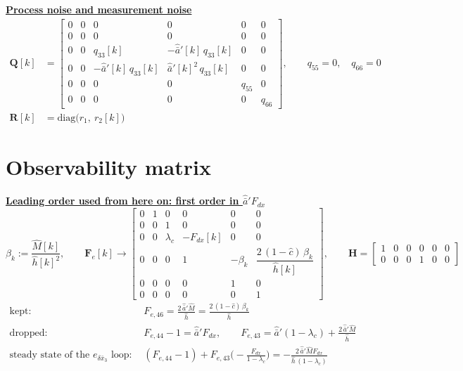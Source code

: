 \documentclass[11pt,a4paper]{ctexart}
\newcommand{\lc}{\lambda_c}
\newcommand{\bx}{\bar{x}}
\newcommand{\ba}{\bar{a}}
\newcommand{\hh}{\hat{h}}
\newcommand{\ch}{\hat{c}}
\newcommand{\hd}[1]{\par\bigskip\noindent\underline{\textbf{#1}}}
\begin{document}
\hd{Process noise and measurement noise}
\[
\begin{aligned}
\mathbf{Q}[k] &=
\begin{bmatrix}
0 & 0 & 0 & 0 & 0 & 0 \\
0 & 0 & 0 & 0 & 0 & 0 \\
0 & 0 & q_{33}[k] & -\hat{\ba}'[k]\,q_{33}[k] & 0 & 0 \\
0 & 0 & -\hat{\ba}'[k]\,q_{33}[k] & \hat{\ba}'[k]^{2}\,q_{33}[k] & 0 & 0 \\
0 & 0 & 0 & 0 & q_{55} & 0 \\
0 & 0 & 0 & 0 & 0 & q_{66}
\end{bmatrix},
\qquad q_{55} = 0, \quad q_{66} = 0 \\
\mathbf{R}[k] &= \mathrm{diag}\big(r_1,\ r_2[k]\big)
\end{aligned}
\]

\clearpage
\section{Observability matrix}

\hd{Leading order used from here on: first order in $\hat{\ba}'F_{dx}$}
\[
\beta_k := \frac{\hat{M}[k]}{\hh[k]^{2}}, \qquad
\mathbf{F}_e[k] \to
\begin{bmatrix}
0 & 1 & 0 & 0 & 0 & 0 \\
0 & 0 & 1 & 0 & 0 & 0 \\
0 & 0 & \lc & -F_{dx}[k] & 0 & 0 \\
0 & 0 & 0 & 1 & -\beta_k & \dfrac{2\,(1-\ch)\,\beta_k}{\hh[k]} \\
0 & 0 & 0 & 0 & 1 & 0 \\
0 & 0 & 0 & 0 & 0 & 1
\end{bmatrix}, \qquad
\mathbf{H} =
\begin{bmatrix}
1 & 0 & 0 & 0 & 0 & 0 \\
0 & 0 & 0 & 1 & 0 & 0
\end{bmatrix}
\]
\[
\begin{aligned}
\text{kept:}\quad & F_{e,46} = \frac{2\,\hat{\ba}'\hat{M}}{\hh} = \frac{2\,(1-\ch)\,\beta_k}{\hh} \\
\text{dropped:}\quad & F_{e,44} - 1 = \hat{\ba}'F_{dx}, \qquad F_{e,43} = \hat{\ba}'(1-\lc) + \frac{2\,\hat{\ba}'\hat{M}}{\hh} \\
\text{steady state of the } e_{\delta\bx_3} \text{ loop:}\quad & (F_{e,44} - 1) + F_{e,43}\Big(-\frac{F_{dx}}{1-\lc}\Big) = -\frac{2\,\hat{\ba}'\hat{M}F_{dx}}{\hh\,(1-\lc)}
\end{aligned}
\]
\end{document}
